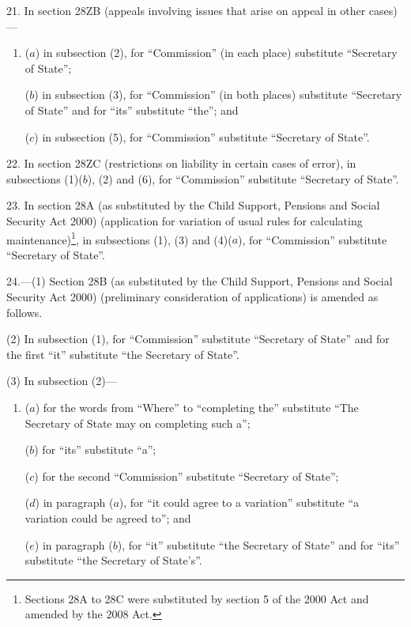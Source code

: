 \documentclass[12pt,a4paper]{article}
\begin{document}
\medskip

21.  In section 28ZB (appeals involving issues that arise on appeal in other cases)—
\begin{enumerate}\item[]
($a$) in subsection (2), for “Commission” (in each place) substitute “Secretary of State”;

($b$) in subsection (3), for “Commission” (in both places) substitute “Secretary of State” and for “its” substitute “the”; and

($c$) in subsection (5), for “Commission” substitute “Secretary of State”.
\end{enumerate}

\medskip

22.  In section 28ZC (restrictions on liability in certain cases of error), in subsections (1)($b$), (2) and (6), for “Commission” substitute “Secretary of State”.

\medskip

23.  In section 28A (as substituted by the Child Support, Pensions and Social Security Act 2000) (application for variation of usual rules for calculating maintenance)\footnote{Sections 28A to 28C were substituted by section 5 of the 2000 Act and amended by the 2008 Act.}, in subsections (1), (3) and (4)($a$), for “Commission” substitute “Secretary of State”.

\medskip

24.---(1)  Section 28B (as substituted by the Child Support, Pensions and Social Security Act 2000) (preliminary consideration of applications) is amended as follows.

(2) In subsection (1), for “Commission” substitute “Secretary of State” and for the first “it” substitute “the Secretary of State”.

(3) In subsection (2)—
\begin{enumerate}\item[]
($a$) for the words from “Where” to “completing the” substitute “The Secretary of State may on completing such a”;

($b$) for “its” substitute “a”;

($c$) for the second “Commission” substitute “Secretary of State”;

($d$) in paragraph ($a$), for “it could agree to a variation” substitute “a variation could be agreed to”; and

($e$) in paragraph ($b$), for “it” substitute “the Secretary of State” and for “its” substitute “the Secretary of State’s”.
\end{enumerate}
\end{document}
